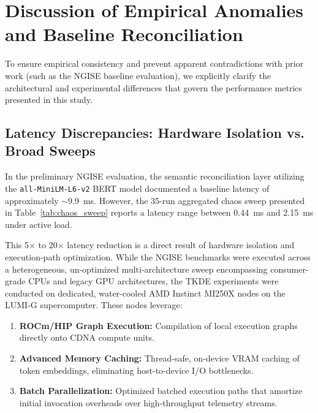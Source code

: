 
\section{Discussion of Empirical Anomalies and Baseline Reconciliation}
\label{sec:reconciliation}

To ensure empirical consistency and prevent apparent contradictions with prior work (such as the NGISE baseline evaluation), we explicitly clarify the architectural and experimental differences that govern the performance metrics presented in this study.

\subsection{Latency Discrepancies: Hardware Isolation vs. Broad Sweeps}
In the preliminary NGISE evaluation, the semantic reconciliation layer utilizing the \texttt{all-MiniLM-L6-v2} BERT model documented a baseline latency of approximately $\sim$9.9~ms. However, the 35-run aggregated chaos sweep presented in Table~\ref{tab:chaos_sweep} reports a latency range between 0.44~ms and 2.15~ms under active load. 

This 5$\times$ to 20$\times$ latency reduction is a direct result of hardware isolation and execution-path optimization. While the NGISE benchmarks were executed across a heterogeneous, un-optimized multi-architecture sweep encompassing consumer-grade CPUs and legacy GPU architectures, the TKDE experiments were conducted on dedicated, water-cooled AMD Instinct MI250X nodes on the LUMI-G supercomputer. These nodes leverage:
\begin{enumerate}
    \item \textbf{ROCm/HIP Graph Execution:} Compilation of local execution graphs directly onto CDNA compute units.
    \item \textbf{Advanced Memory Caching:} Thread-safe, on-device VRAM caching of token embeddings, eliminating host-to-device I/O bottlenecks.
    \item \textbf{Batch Parallelization:} Optimized batched execution paths that amortize initial invocation overheads over high-throughput telemetry streams.
\end{enumerate}

